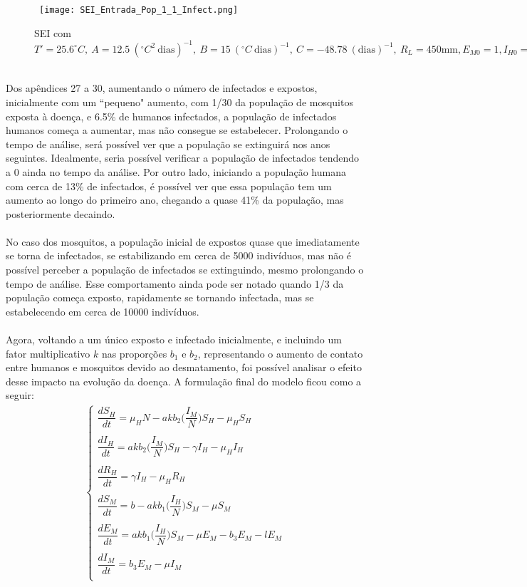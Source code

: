 \begin{figure}[!ht]
        \centering
        \hbox{\hspace{2.5em} \texttt{[image: SEI\_Entrada\_Pop\_1\_1\_Infect.png]}}
        \caption{SEI com $T'=25.6 ^\circ C, \ A=12.5 \ (^\circ C^2 \ \text{dias})^{-1}, \ B=15 \ (^\circ C \ \text{dias})^{-1}, \ C=-48.78 \ (\text{dias})^{-1}, \ R_L=450 \text{mm}, E_{M0}=1, I_{H0}=1$} 
\end{figure} 
\\Dos apêndices 27 a 30, aumentando o número de infectados e expostos, inicialmente com um 
``pequeno" aumento, com 1/30 da população de mosquitos exposta à doença, e 6.5\% 
de humanos infectados, a população de infectados humanos começa a aumentar, 
mas não consegue se estabelecer. Prolongando o tempo de análise, será possível 
ver que a população se extinguirá nos anos seguintes. Idealmente, seria 
possível verificar a população de infectados tendendo a 0 ainda no tempo da 
análise. Por outro lado, iniciando a população humana com cerca de 13\% de infectados, 
é possível ver que essa população tem um aumento ao longo do primeiro ano, 
chegando a quase 41\% da população, mas posteriormente decaindo.
\\\\
No caso dos mosquitos, a população inicial de expostos quase que 
imediatamente se torna de infectados, se estabilizando em cerca de 5000 
indivíduos, mas não é possível perceber a população de infectados se 
extinguindo, mesmo prolongando o tempo de análise. Esse comportamento 
ainda pode ser notado quando 1/3 da população começa exposto, rapidamente 
se tornando infectada, mas se estabelecendo em cerca de 10000 indivíduos. 
\\\\
Agora, voltando a um único exposto e infectado inicialmente, e incluindo um fator
multiplicativo $k$ nas proporções $b_1$ e $b_2$, representando o aumento de contato
entre humanos e mosquitos devido ao desmatamento, foi possível analisar o efeito desse impacto
na evolução da doença. A formulação final do modelo ficou como a seguir:
\begin{gather*}
\begin{cases}
\dfrac{dS_H}{dt} = \mu_HN-akb_2\bigg(\dfrac{I_M}{N}\bigg)S_H - \mu_HS_H\\
\\
\dfrac{dI_H}{dt} = akb_2\bigg(\dfrac{I_M}{N}\bigg)S_H-\gamma I_H - \mu_HI_H\\
\\
\dfrac{dR_H}{dt} = \gamma I_H - \mu_HR_H\\
\\
\dfrac{dS_M}{dt} = b - akb_1\bigg(\dfrac{I_H}{N}\bigg)S_M - \mu S_M\\
\\
\dfrac{dE_M}{dt} = akb_1\bigg(\dfrac{I_H}{N}\bigg)S_M - \mu E_M - b_3E_M -lE_M\\
\\
\dfrac{dI_M}{dt} = b_3E_M -\mu I_M\\
\end{cases}
\end{gather*}
